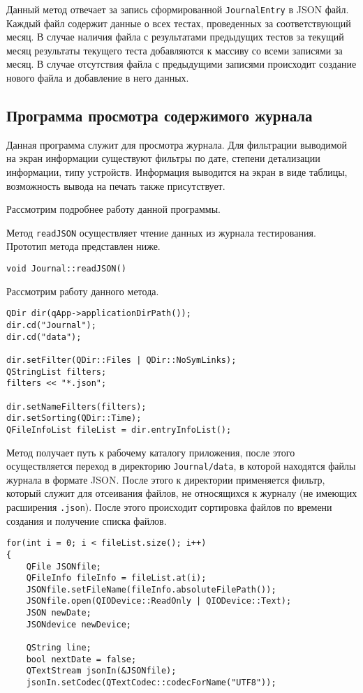 Данный метод отвечает за запись сформированной \texttt{JournalEntry} в JSON файл. Каждый файл содержит данные о всех
тестах, проведенных за соответствующий месяц. В случае наличия файла с результатами предыдущих тестов за текущий месяц
результаты текущего теста добавляются к массиву со всеми записями за месяц. В случае отсутствия файла с предыдущими
записями происходит создание нового файла и добавление в него данных.

\subsection{Программа просмотра содержимого журнала}
Данная программа служит для просмотра журнала. Для фильтрации выводимой на экран информации существуют фильтры по дате,
степени детализации информации, типу устройств. Информация выводится на экран в виде таблицы, возможность вывода на
печать также присутствует.

Рассмотрим подробнее работу данной программы.

Метод \texttt{readJSON} осуществляет чтение данных из журнала тестирования. Прототип метода представлен ниже.
\medskip
\begin{verbatim}
void Journal::readJSON()
\end{verbatim}
\medskip

Рассмотрим работу данного метода.
\medskip
\begin{verbatim}
QDir dir(qApp->applicationDirPath());
dir.cd("Journal");
dir.cd("data");

dir.setFilter(QDir::Files | QDir::NoSymLinks);
QStringList filters;
filters << "*.json";

dir.setNameFilters(filters);
dir.setSorting(QDir::Time);
QFileInfoList fileList = dir.entryInfoList();
\end{verbatim}
\medskip

Метод получает путь к рабочему каталогу приложения, после этого осуществляется переход в директорию
\texttt{Journal/data}, в которой находятся файлы журнала в формате JSON. После этого к директории применяется фильтр,
который служит для отсеивания файлов, не относящихся к журналу (не имеющих расширения \texttt{.json}). После этого
происходит сортировка файлов по времени создания и получение списка файлов.

\medskip
\begin{verbatim}
for(int i = 0; i < fileList.size(); i++)
{
	QFile JSONfile;
	QFileInfo fileInfo = fileList.at(i);
	JSONfile.setFileName(fileInfo.absoluteFilePath());
	JSONfile.open(QIODevice::ReadOnly | QIODevice::Text);
	JSON newDate;
	JSONdevice newDevice;

	QString line;
	bool nextDate = false;
	QTextStream jsonIn(&JSONfile);
	jsonIn.setCodec(QTextCodec::codecForName("UTF8"));
\end{verbatim}
\medskip

